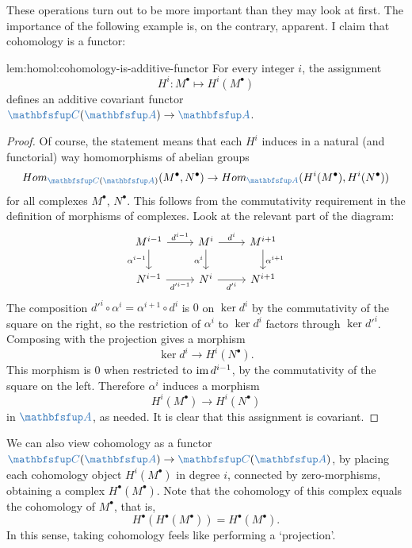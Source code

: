These operations turn out to be more important than they may look at
first. The importance of the following example is, on the contrary,
apparent. I claim that cohomology is a functor:

\begin{lem}{}{lem:homol:cohomology-is-additive-functor}
  For every integer $i$, the assignment
  \[
    H^i : M^\bullet \longmapsto H^i(M^\bullet)
  \]
  defines an additive covariant functor
  $\categ{C}(\categ{A}) \to \categ{A}$.
\end{lem}

\begin{proof}
  Of course, the statement means that each $H^i$ induces in a natural
  (and functorial) way homomorphisms of abelian groups
  \[
    \Hom_{\categ{C}(\categ{A})}(M^\bullet, N^\bullet) \to
    \Hom_{\categ{A}}(H^i(M^\bullet), H^i(N^\bullet))
  \]
  for all complexes $M^\bullet$, $N^\bullet$. This follows from the
  commutativity requirement in the definition of morphisms of
  complexes. Look at the relevant part of the diagram:
  \[\begin{tikzcd}
      M^{i-1} \arrow[r, "d^{i-1}"] \arrow[d, "\alpha^{i-1}"'] & M^i
      \arrow[r, "d^i"] \arrow[d, "\alpha^i"'] &
      M^{i+1} \arrow[d, "\alpha^{i+1}"] \\
      N^{i-1} \arrow[r, "d'^{i-1}"'] & N^i \arrow[r, "d'^i"'] &
      N^{i+1}
    \end{tikzcd}\] The composition
  $d'^i \circ \alpha^i = \alpha^{i+1} \circ d^i$ is $0$ on $\ker d^i$
  by the commutativity of the square on the right, so the restriction
  of $\alpha^i$ to $\ker d^i$ factors through $\ker d'^i$. Composing
  with the projection gives a morphism
  \[
    \ker d^i \to H^i(N^\bullet).
  \]
  This morphism is $0$ when restricted to $\operatorname{im} d^{i-1}$, by the
  commutativity of the square on the left. Therefore $\alpha^i$
  induces a morphism
  \[
    H^i(M^\bullet) \to H^i(N^\bullet)
  \]
  in $\categ{A}$, as needed. It is clear that this assignment is
  covariant.
\end{proof}

We can also view cohomology as a functor
$\categ{C}(\categ{A}) \to \categ{C}(\categ{A})$, by placing each
cohomology object $H^i(M^\bullet)$ in degree $i$, connected by
zero-morphisms, obtaining a complex $H^\bullet(M^\bullet)$. Note that
the cohomology of this complex equals the cohomology of $M^\bullet$,
that is,
\[
  H^\bullet(H^\bullet(M^\bullet)) = H^\bullet(M^\bullet).
\]
In this sense, taking cohomology feels like performing a `projection'.

